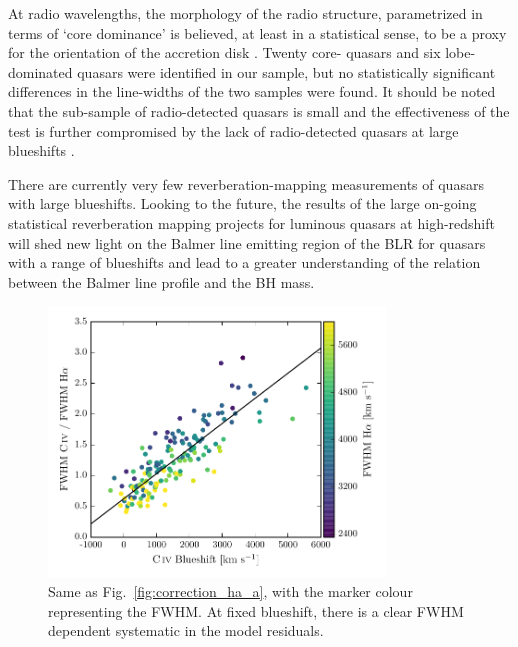 At radio wavelengths, the morphology of the radio structure, parametrized in terms of `core dominance' is believed, at least in a statistical sense, to be a proxy for the orientation of the accretion disk \citep[e.g.][]{jackson91}.
Twenty core- quasars and six lobe-dominated quasars were identified in our sample, but no statistically significant differences in the \ha line-widths of the two samples were found. 
It should be noted that the sub-sample of radio-detected quasars is small and the effectiveness of the test is further compromised by the lack of radio-detected quasars at large blueshifts \citep[see figure $14$ of][for example]{richards11}.


There are currently very few reverberation-mapping measurements of quasars with large  blueshifts.
Looking to the future, the results of the large on-going statistical reverberation mapping projects \citep[e.g.][]{shen15,kingoz15} for luminous quasars at high-redshift will shed new light on the Balmer line emitting region of the BLR for quasars with a range of  blueshifts and lead to a greater understanding of the relation between the Balmer line profile and the BH mass. 

\begin{figure}
    \centering 
    \includegraphics[width=0.8\textwidth]{figures/chapter03/fwhm_correction_color.pdf}  
    \caption[{Same as Fig.~\ref{fig:correction_ha_a}, with the marker colour representing the \ha FWHM.}]{Same as Fig.~\ref{fig:correction_ha_a}, with the marker colour representing the \ha FWHM. At fixed  blueshift, there is a clear \ha FWHM dependent systematic in the model residuals.}   
    \label{fig:residuals_ha_fwhm}
\end{figure}

